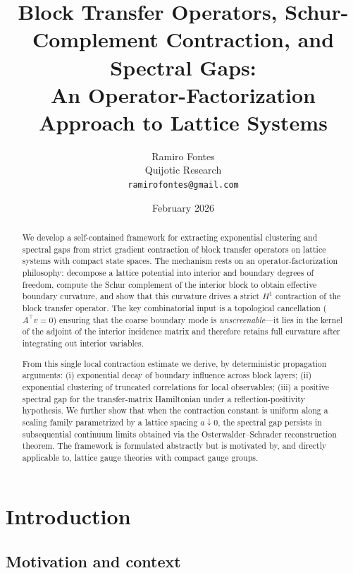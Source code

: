 \documentclass[11pt]{article}
\title{Block Transfer Operators, Schur-Complement Contraction, and Spectral Gaps:\\
An Operator-Factorization Approach to Lattice Systems}
\author{Ramiro Fontes\\Quijotic Research\\\texttt{ramirofontes@gmail.com}}
\date{February 2026}
\theoremstyle{definition}
\newcommand{\1}{\mathbf{1}}
\begin{document}
\maketitle

\begin{abstract}
We develop a self-contained framework for extracting exponential clustering and spectral gaps
from strict gradient contraction of block transfer operators on lattice systems with compact
state spaces.  The mechanism rests on an operator-factorization philosophy:
decompose a lattice potential into interior and boundary degrees of freedom,
compute the Schur complement of the interior block to obtain effective boundary curvature,
and show that this curvature drives a strict $H^1$ contraction of the block transfer operator.
The key combinatorial input is a topological cancellation ($A^\top v = 0$) ensuring that the
coarse boundary mode is \emph{unscreenable}---it lies in the kernel of the adjoint
of the interior incidence matrix and therefore retains full curvature after integrating out
interior variables.

From this single local contraction estimate we derive, by deterministic propagation arguments:
(i) exponential decay of boundary influence across block layers;
(ii) exponential clustering of truncated correlations for local observables;
(iii) a positive spectral gap for the transfer-matrix Hamiltonian under a
reflection-positivity hypothesis.
We further show that when the contraction constant is uniform along a
scaling family parametrized by a lattice spacing $a\downarrow 0$, the spectral gap persists
in subsequential continuum limits obtained via the Osterwalder--Schrader reconstruction theorem.
The framework is formulated abstractly but is motivated by, and directly applicable to,
lattice gauge theories with compact gauge groups.
\end{abstract}

\tableofcontents

\section{Introduction}\label{sec:intro}

\subsection{Motivation and context}
\end{document}
